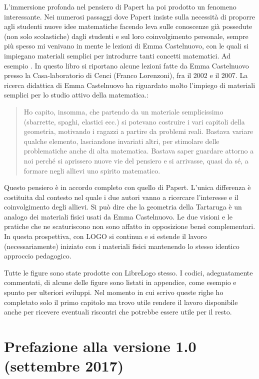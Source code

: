 L'immersione profonda nel pensiero di Papert ha poi prodotto un fenomeno interessante. Nei
numerosi passaggi dove Papert insiste sulla necessità di proporre agli studenti nuove idee
matematiche facendo leva sulle conoscenze già possedute (non solo scolastiche) dagli studenti e sul loro coinvolgimento personale, sempre più spesso mi venivano in mente le lezioni di Emma
Castelnuovo, con le quali si impiegano materiali semplici per introdurre tanti concetti matematici. Ad esempio \cite{Castelnuovo}. In questo
libro si riportano alcune lezioni fatte da Emma Castelnuovo presso la Casa-laboratorio di Cenci (Franco Lorenzoni), fra il 2002 e il 2007. La ricerca didattica di Emma Castelnuovo ha riguardato molto l'impiego di materiali semplici per lo studio attivo della matematica.:

\begin{quote}
Ho capito, insomma, che partendo da un materiale semplicissimo (sbarrette, spaghi, elastici ecc.) si potevano costruire i vari capitoli della geometria, motivando i ragazzi a partire da problemi reali. Bastava variare qualche elemento, lasciandone invariati altri, per stimolare delle problematiche anche di alta matematica. Bastava saper guardare attorno a noi perché si aprissero nuove vie del pensiero e si arrivasse, quasi da sé, a formare negli allievi uno spirito matematico.
\end{quote}

Questo pensiero è in accordo completo con quello di Papert. L'unica differenza è costituita dal
contesto nel quale i due autori vanno a ricercare l'interesse e il coinvolgimento degli allievi. Si può dire che la geometria della Tartaruga è un analogo dei materiali fisici usati da Emma Castelnuovo.
Le due visioni e le pratiche che ne scaturiscono non sono affatto in opposizione bensì
complementari. In questa prospettiva, con LOGO si continua e si estende il lavoro
(necessariamente) iniziato con i materiali fisici mantenendo lo stesso identico approccio
pedagogico.

Tutte le figure sono state prodotte con LibreLogo stesso. I codici, adeguatamente commentati, di alcune delle figure sono listati in appendice, come esempio e spunto per ulteriori sviluppi. Nel momento in cui scrivo queste righe ho completato solo il primo capitolo ma trovo utile rendere il lavoro disponibile anche per ricevere eventuali riscontri che potrebbe essere utile per il resto.

\section{Prefazione alla versione 1.0 (settembre 2017)}


